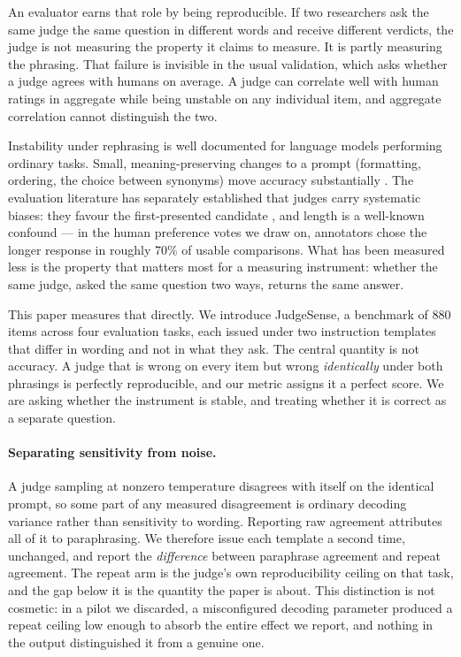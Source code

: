 \documentclass[11pt]{article}          %
\begin{document}
An evaluator earns that role by being reproducible. If two researchers ask the
same judge the same question in different words and receive different verdicts,
the judge is not measuring the property it claims to measure. It is partly
measuring the phrasing. That failure is invisible in the usual validation, which
asks whether a judge agrees with humans on average. A judge can correlate well
with human ratings in aggregate while being unstable on any individual item, and
aggregate correlation cannot distinguish the two.

Instability under rephrasing is well documented for language models performing
ordinary tasks. Small, meaning-preserving changes to a prompt (formatting, ordering, the choice
between synonyms) move accuracy substantially
\citep{sclar2024quantifying, mizrahi2024state, elazar2021measuring}. The
evaluation literature has separately established that judges carry systematic
biases: they favour the first-presented candidate
\citep{wang2023fair, shi2024judging}, and length is a well-known confound --- in
the human preference votes we draw on, annotators chose the longer response in
roughly 70\% of usable comparisons. What has been measured less is the
property that matters most for a measuring instrument: whether the same judge,
asked the same question two ways, returns the same answer.

This paper measures that directly. We introduce JudgeSense, a benchmark of 880
items across four evaluation tasks, each issued under two instruction templates
that differ in wording and not in what they ask. The central quantity is not
accuracy. A judge that is wrong on every item but wrong \emph{identically} under
both phrasings is perfectly reproducible, and our metric assigns it a perfect
score. We are asking whether the instrument is stable, and treating whether it is
correct as a separate question.

\paragraph{Separating sensitivity from noise.}
A judge sampling at nonzero temperature disagrees with itself on the identical
prompt, so some part of any measured disagreement is ordinary decoding variance
rather than sensitivity to wording. Reporting raw agreement attributes all of it
to paraphrasing. We therefore issue each template a second time, unchanged, and
report the \emph{difference} between paraphrase agreement and repeat agreement.
The repeat arm is the judge's own reproducibility ceiling on that task, and the
gap below it is the quantity the paper is about. This distinction is not
cosmetic: in a pilot we discarded, a misconfigured decoding parameter produced a
repeat ceiling low enough to absorb the entire effect we report, and nothing in
the output distinguished it from a genuine one.
\end{document}
